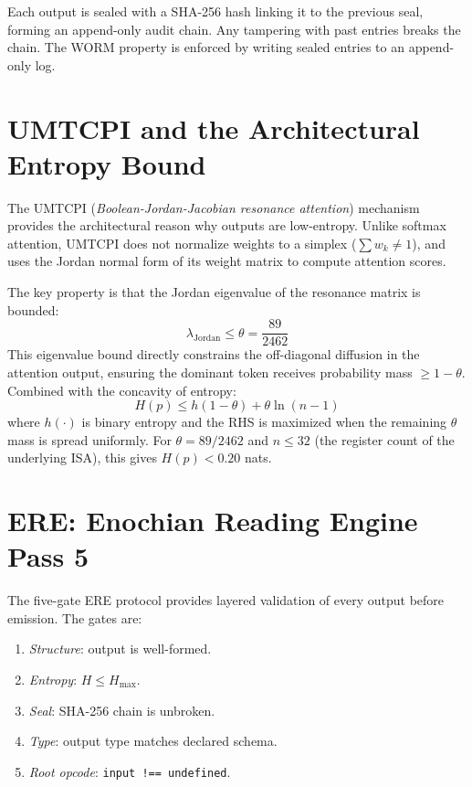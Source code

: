 \documentclass[sigconf,natbib=false]{acmart}
\begin{document}
Each output is sealed with a SHA-256 hash linking it to the previous seal,
forming an append-only audit chain. Any tampering with past entries breaks the
chain. The WORM property is enforced by writing sealed entries to an
append-only log.


\section{UMTCPI and the Architectural Entropy Bound}
\label{sec:umtcpi}

The UMTCPI (\emph{Boolean-Jordan-Jacobian resonance attention}) mechanism
provides the architectural reason why outputs are low-entropy. Unlike softmax
attention, UMTCPI does not normalize weights to a simplex ($\sum w_k \neq 1$),
and uses the Jordan normal form of its weight matrix to compute attention scores.

The key property is that the Jordan eigenvalue of the resonance matrix is
bounded:
\[
  \lambda_{\text{Jordan}} \leq \theta = \frac{89}{2462}
\]
This eigenvalue bound directly constrains the off-diagonal diffusion in the
attention output, ensuring the dominant token receives probability mass
$\geq 1 - \theta$. Combined with the concavity of entropy:
\[
  H(p) \leq h(1 - \theta) + \theta \ln(n-1)
\]
where $h(\cdot)$ is binary entropy and the RHS is maximized when the remaining
$\theta$ mass is spread uniformly. For $\theta = 89/2462$ and $n \leq 32$
(the register count of the underlying ISA), this gives $H(p) < 0.20$ nats.


\section{ERE: Enochian Reading Engine Pass 5}
\label{sec:ere}

The five-gate ERE protocol provides layered validation of every output before
emission. The gates are:
\begin{enumerate}
  \item[\textbf{P1}] \textit{Structure}: output is well-formed.
  \item[\textbf{P2}] \textit{Entropy}: $H \leq H_{\max}$.
  \item[\textbf{P3}] \textit{Seal}: SHA-256 chain is unbroken.
  \item[\textbf{P4}] \textit{Type}: output type matches declared schema.
  \item[\textbf{P5}] \textit{Root opcode}: \texttt{input !== undefined}.
\end{enumerate}
\end{document}
